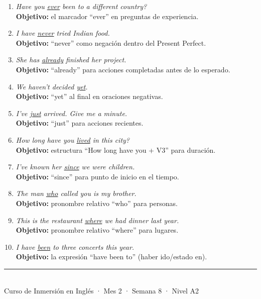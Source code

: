 \documentclass[12pt,a4paper]{article}
\begin{document}
\begin{cajamineria}

\begin{enumerate}[leftmargin=1.2cm]
  \item \textit{Have you \underline{ever} been to a different country?}\\
    {\small\textbf{Objetivo:} el marcador ``ever'' en preguntas de experiencia.}

  \item \textit{I have \underline{never} tried Indian food.}\\
    {\small\textbf{Objetivo:} ``never'' como negación dentro del Present Perfect.}

  \item \textit{She has \underline{already} finished her project.}\\
    {\small\textbf{Objetivo:} ``already'' para acciones completadas antes de lo esperado.}

  \item \textit{We haven't decided \underline{yet}.}\\
    {\small\textbf{Objetivo:} ``yet'' al final en oraciones negativas.}

  \item \textit{I've \underline{just} arrived. Give me a minute.}\\
    {\small\textbf{Objetivo:} ``just'' para acciones recientes.}

  \item \textit{How long have you \underline{lived} in this city?}\\
    {\small\textbf{Objetivo:} estructura ``How long have you + V3'' para duración.}

  \item \textit{I've known her \underline{since} we were children.}\\
    {\small\textbf{Objetivo:} ``since'' para punto de inicio en el tiempo.}

  \item \textit{The man \underline{who} called you is my brother.}\\
    {\small\textbf{Objetivo:} pronombre relativo ``who'' para personas.}

  \item \textit{This is the restaurant \underline{where} we had dinner last year.}\\
    {\small\textbf{Objetivo:} pronombre relativo ``where'' para lugares.}

  \item \textit{I have \underline{been} to three concerts this year.}\\
    {\small\textbf{Objetivo:} la expresión ``have been to'' (haber ido/estado en).}
\end{enumerate}
\end{cajamineria}

\vfill
\begin{center}
\rule{0.5\textwidth}{0.5pt}\\[0.3cm]
{\small\color{grissuave} Curso de Inmersión en Inglés · Mes 2 · Semana 8 · Nivel A2}
\end{center}
\end{document}
